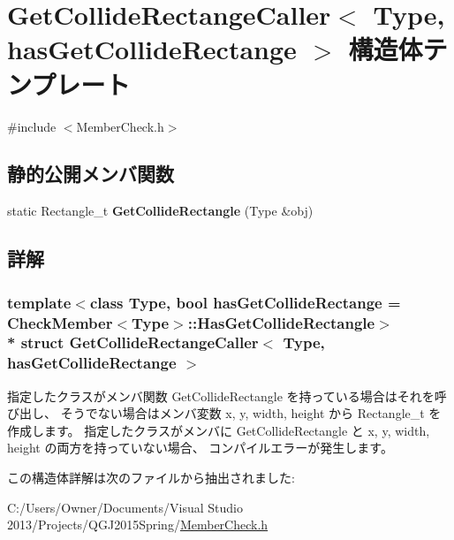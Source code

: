 \hypertarget{struct_get_collide_rectange_caller}{}\section{Get\+Collide\+Rectange\+Caller$<$ Type, has\+Get\+Collide\+Rectange $>$ 構造体テンプレート}
\label{struct_get_collide_rectange_caller}


{\ttfamily \#include $<$Member\+Check.\+h$>$}

\subsection*{静的公開メンバ関数}
\begin{DoxyCompactItemize}
\item 
static Rectangle\+\_\+t {\bfseries Get\+Collide\+Rectangle} (Type \&obj)\hypertarget{struct_get_collide_rectange_caller_a1b5b9fd197bf7cb119c5cbbb22cffc7a}{}\label{struct_get_collide_rectange_caller_a1b5b9fd197bf7cb119c5cbbb22cffc7a}

\end{DoxyCompactItemize}


\subsection{詳解}
\subsubsection*{template$<$class Type, bool has\+Get\+Collide\+Rectange = Check\+Member$<$\+Type$>$\+::\+Has\+Get\+Collide\+Rectangle$>$\\*
struct Get\+Collide\+Rectange\+Caller$<$ Type, has\+Get\+Collide\+Rectange $>$}

指定したクラスがメンバ関数 Get\+Collide\+Rectangle を持っている場合はそれを呼び出し、 そうでない場合はメンバ変数 x, y, width, height から Rectangle\+\_\+t を作成します。 指定したクラスがメンバに Get\+Collide\+Rectangle と x, y, width, height の両方を持っていない場合、 コンパイルエラーが発生します。 

この構造体詳解は次のファイルから抽出されました\+:\begin{DoxyCompactItemize}
\item 
C\+:/\+Users/\+Owner/\+Documents/\+Visual Studio 2013/\+Projects/\+Q\+G\+J2015\+Spring/\hyperlink{_member_check_8h}{Member\+Check.\+h}\end{DoxyCompactItemize}
